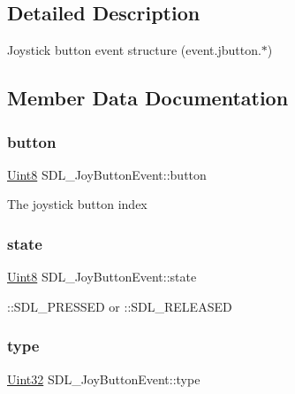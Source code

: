 \subsection{Detailed Description}
Joystick button event structure (event.\+jbutton.$\ast$) 

\subsection{Member Data Documentation}
\mbox{\label{struct_s_d_l___joy_button_event_a73ebe4261cf80564052af9c1af737a4d}} 
\subsubsection{\texorpdfstring{button}{button}}
{\footnotesize\ttfamily \hyperlink{_s_d_l__stdinc_8h_a2944638813a090aa23e62f4da842c3e2}{Uint8} S\+D\+L\+\_\+\+Joy\+Button\+Event\+::button}

The joystick button index \mbox{\label{struct_s_d_l___joy_button_event_ad3b6f8d9aa2c5e694f664b97d12bcd2b}} 
\subsubsection{\texorpdfstring{state}{state}}
{\footnotesize\ttfamily \hyperlink{_s_d_l__stdinc_8h_a2944638813a090aa23e62f4da842c3e2}{Uint8} S\+D\+L\+\_\+\+Joy\+Button\+Event\+::state}

\+::\+S\+D\+L\+\_\+\+P\+R\+E\+S\+S\+ED or \+::\+S\+D\+L\+\_\+\+R\+E\+L\+E\+A\+S\+ED \mbox{\label{struct_s_d_l___joy_button_event_a8f3312a046d37fa2884b93f69c4cb655}} 
\subsubsection{\texorpdfstring{type}{type}}
{\footnotesize\ttfamily \hyperlink{_s_d_l__stdinc_8h_add440eff171ea5f55cb00c4a9ab8672d}{Uint32} S\+D\+L\+\_\+\+Joy\+Button\+Event\+::type}

